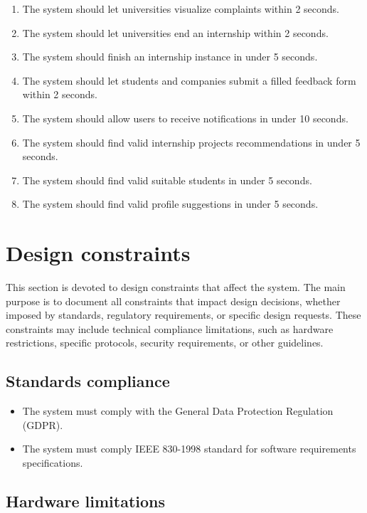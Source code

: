 \begin{enumerate}[label=\textbf{SR\arabic* -}]
    \item The system should let universities visualize complaints within 2 seconds.
    \item The system should let universities end an internship within 2 seconds.
    \item The system should finish an internship instance in under 5 seconds.
    \item The system should let students and companies submit a filled feedback form within 2 seconds.
    \item The system should allow users to receive notifications in under 10 seconds.
    \item The system should find valid internship projects recommendations in under 5 seconds.
    \item The system should find valid suitable students in under 5 seconds.
    \item The system should find valid profile suggestions in under 5 seconds.
\end{enumerate}

\section{Design constraints}

This section is devoted to design constraints that affect the system.
The main purpose is to document all constraints that impact design decisions, whether imposed by standards, regulatory requirements, or specific design requests.
These constraints may include technical compliance limitations, such as hardware restrictions, specific protocols, security requirements, or other guidelines.

\subsection{Standards compliance}

\begin{itemize}
    \item The system must comply with the General Data Protection Regulation (GDPR).
    \item The system must comply IEEE 830-1998 standard for software requirements specifications.
\end{itemize}

\subsection{Hardware limitations}

